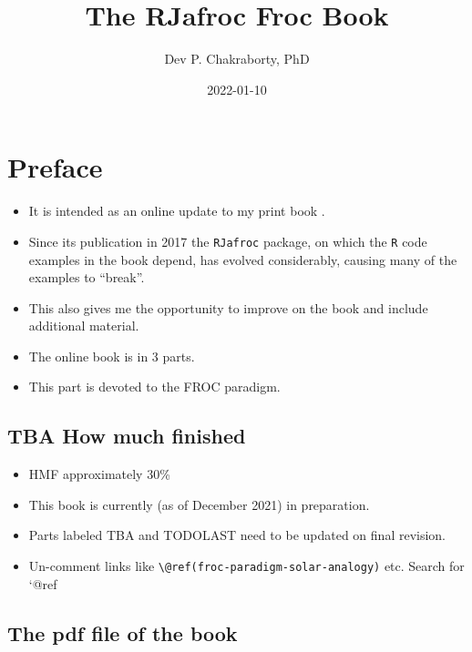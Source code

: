 \documentclass[
]{book}
\title{The RJafroc Froc Book}
\author{Dev P. Chakraborty, PhD}
\date{2022-01-10}
\providecommand{\tightlist}{%
  \setlength{\itemsep}{0pt}\setlength{\parskip}{0pt}}
\begin{document}
\maketitle

{
\setcounter{tocdepth}{1}
\tableofcontents
}
\hypertarget{preface}{%
\chapter*{Preface}\label{preface}}

\begin{itemize}
\tightlist
\item
  It is intended as an online update to my print book \citep{chakraborty2017observer}.
\item
  Since its publication in 2017 the \texttt{RJafroc} package, on which the \texttt{R} code examples in the book depend, has evolved considerably, causing many of the examples to ``break''.
\item
  This also gives me the opportunity to improve on the book and include additional material.
\item
  The online book is in 3 parts.
\item
  This part is devoted to the FROC paradigm.
\end{itemize}

\hypertarget{tba-how-much-finished}{%
\section*{TBA How much finished}\label{tba-how-much-finished}}

\begin{itemize}
\tightlist
\item
  HMF approximately 30\%
\item
  This book is currently (as of December 2021) in preparation.
\item
  Parts labeled TBA and TODOLAST need to be updated on final revision.
\item
  Un-comment links like \texttt{\textbackslash{}@ref(froc-paradigm-solar-analogy)} etc. Search for `@ref
\end{itemize}

\hypertarget{the-pdf-file-of-the-book}{%
\section*{The pdf file of the book}\label{the-pdf-file-of-the-book}}
\end{document}
